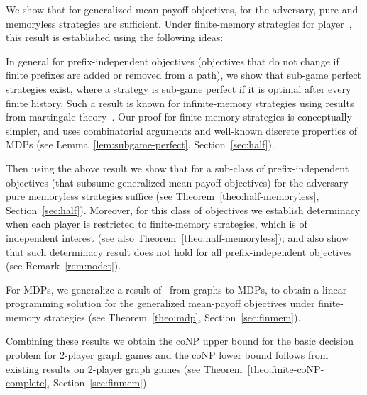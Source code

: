 \documentclass{article}
\newcommand{\half}{}
\begin{document}
\smallskip{}
We show that for generalized mean-payoff objectives, for the adversary, 
pure and memoryless strategies are sufficient. 
Under finite-memory strategies for player~, this result is established
using the following ideas: 
\begin{compactitem}

\item In general for prefix-independent objectives (objectives that do not change
if finite prefixes are added or removed from a path), we show that sub-game perfect 
strategies exist, where a strategy is sub-game perfect if it is optimal after every
finite history.
Such a result is known for infinite-memory strategies using results
from martingale theory~\cite{GK14}. 
Our proof for finite-memory strategies is conceptually simpler, and 
uses combinatorial arguments and well-known discrete properties of MDPs 
(see Lemma~\ref{lem:subgame-perfect}, Section~\ref{sec:half}).

\item Then using the above result we show that for a sub-class of 
prefix-independent objectives (that subsume generalized mean-payoff objectives) 
for the adversary pure memoryless strategies suffice 
(see Theorem~\ref{theo:half-memoryless}, Section~\ref{sec:half}).
Moreover, for this class of objectives we establish determinacy when each
player is restricted to finite-memory strategies, which is of independent 
interest (see also Theorem~\ref{theo:half-memoryless}); and also show that such 
determinacy result does not hold for all prefix-independent objectives 
(see Remark~\ref{rem:nodet}).


\item For MDPs, we generalize a result of~\cite{KS88} from graphs to MDPs, 
to obtain a linear-programming solution for the generalized mean-payoff objectives 
under finite-memory strategies (see Theorem~\ref{theo:mdp}, Section~\ref{sec:finmem}). 
\end{compactitem}
Combining these results we obtain the coNP upper bound for the basic 
decision problem for 2\half-player graph games and the coNP 
lower bound follows from existing results on 2-player graph games 
(see Theorem~\ref{theo:finite-coNP-complete}, Section~\ref{sec:finmem}).
\end{document}
